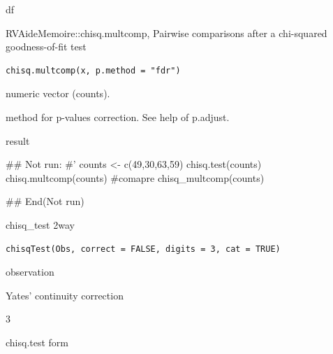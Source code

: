 \documentclass[a4paper]{book}
\begin{document}
%
\begin{Value}
df
\end{Value}
%
\begin{Description}
RVAideMemoire::chisq.multcomp, Pairwise comparisons after a chi-squared goodness-of-fit test
\end{Description}
%
\begin{Usage}
\begin{verbatim}
chisq.multcomp(x, p.method = "fdr")
\end{verbatim}
\end{Usage}
%
\begin{Arguments}
\begin{ldescription}
\item[\code{x}] numeric vector (counts).

\item[\code{p.method}] method for p-values correction. See help of p.adjust.
\end{ldescription}
\end{Arguments}
%
\begin{Value}
result
\end{Value}
%
\begin{Examples}
\begin{ExampleCode}

\#\# Not run: 
#'
counts <- c(49,30,63,59)
chisq.test(counts)
chisq.multcomp(counts)
#comapre
chisq_multcomp(counts)


## End(Not run)
\end{ExampleCode}
\end{Examples}
%
\begin{Description}
chisq\_test 2way
\end{Description}
%
\begin{Usage}
\begin{verbatim}
chisqTest(Obs, correct = FALSE, digits = 3, cat = TRUE)
\end{verbatim}
\end{Usage}
%
\begin{Arguments}
\begin{ldescription}
\item[\code{Obs}] observation

\item[\code{correct}] Yates' continuity correction

\item[\code{digits}] 3

\item[\code{cat}] chisq.test form
\end{ldescription}
\end{Arguments}
\end{document}
